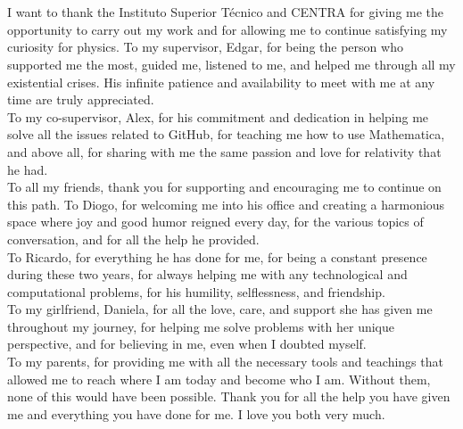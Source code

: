 
\section*{\acknowledgments}


I want to thank the Instituto Superior Técnico and CENTRA for giving me the opportunity to carry out my work and for allowing me to continue satisfying my curiosity for physics. To my supervisor, Edgar, for being the person who supported me the most, guided me, listened to me, and helped me through all my existential crises. His infinite patience and availability to meet with me at any time are truly appreciated. \\
To my co-supervisor, Alex, for his commitment and dedication in helping me solve all the issues related to GitHub, for teaching me how to use Mathematica, and above all, for sharing with me the same passion and love for relativity that he had. \\
To all my friends, thank you for supporting and encouraging me to continue on this path. To Diogo, for welcoming me into his office and creating a harmonious space where joy and good humor reigned every day, for the various topics of conversation, and for all the help he provided. \\
To Ricardo, for everything he has done for me, for being a constant presence during these two years, for always helping me with any technological and computational problems, for his humility, selflessness, and friendship. \\
To my girlfriend, Daniela, for all the love, care, and support she has given me throughout my journey, for helping me solve problems with her unique perspective, and for believing in me, even when I doubted myself. \\
To my parents, for providing me with all the necessary tools and teachings that allowed me to reach where I am today and become who I am. Without them, none of this would have been possible. Thank you for all the help you have given me and everything you have done for me. I love you both very much.

